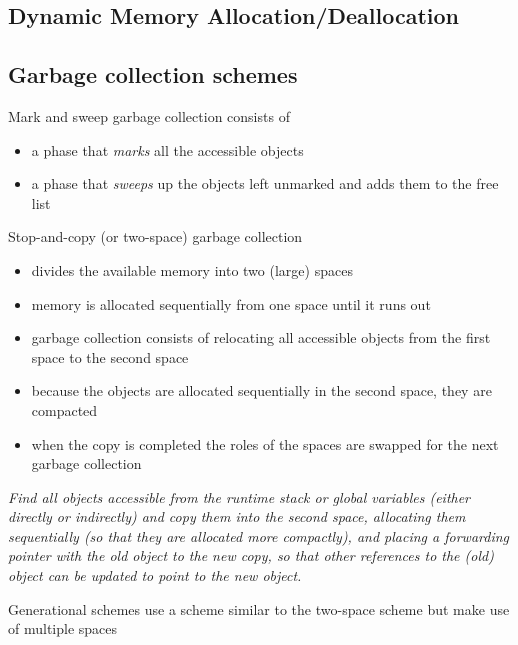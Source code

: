 \documentclass[fontsize=10pt,a4paper]{article}
\begin{document}
\begin{multicols}{3}
    \section{Dynamic Memory Allocation/Deallocation}

    \subsection{Garbage collection schemes}

    Mark and sweep garbage collection consists of

    \begin{itemize}
        \item a phase that \textit{marks} all the accessible objects
        \item a phase that \textit{sweeps} up the objects left unmarked and adds them to the free list
    \end{itemize}

    Stop-and-copy (or two-space) garbage collection

    \begin{itemize}
        \item divides the available memory into two (large) spaces
        \item memory is allocated sequentially from one space until it runs out
        \item garbage collection consists of relocating all accessible objects from the first space to the second space
        \item because the objects are allocated sequentially in the second space, they are compacted
        \item when the copy is completed the roles of the spaces are swapped for the next garbage collection
    \end{itemize}

    \textit{Find all objects accessible from the runtime stack or global variables (either directly or indirectly) and copy them into the second space, allocating them sequentially (so that they are allocated more compactly), and placing a forwarding pointer with the old object to the new copy, so that other references to the (old) object can be updated to point to the new object.}

    Generational schemes use a scheme similar to the two-space scheme but make use of multiple spaces


\end{multicols}
\end{document}
